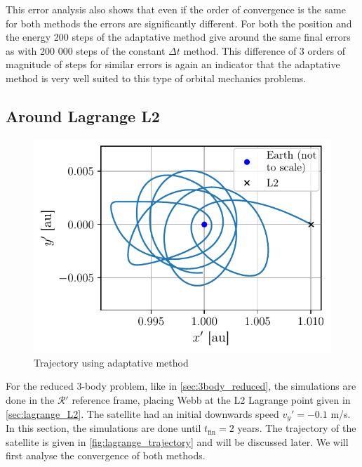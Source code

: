 This error analysis also shows that even if the order of convergence is the same for both methods the errors are significantly different. For both the position and the energy 200 steps of the adaptative method give around the same final errors as with 200 000 steps of the constant $\Delta t$ method. This difference of 3 orders of magnitude of steps for similar errors is again an indicator that the adaptative method is very well suited to this type of orbital mechanics problems.

\subsection{Around Lagrange L2}

\begin{figure}
    \vspace*{-1cm}
    \centering
    \includegraphics[width=\linewidth]{figures/lagrange_trajectory.pdf}
    \caption{Trajectory using adaptative method}
    \label{fig:lagrange_trajectory}
    \vspace*{-0.5cm}
\end{figure}
For the reduced 3-body problem, like in \autoref{sec:3body_reduced}, the simulations are done in the \(\mathcal R'\) reference frame, placing Webb at the L2 Lagrange point given in \autoref{sec:lagrange_L2}. The satellite had an initial downwards speed \(v_y' = -0.1\) m/s. In this section, the simulations are done until \(t_\textrm{fin} = 2\) years. The trajectory of the satellite is given in \autoref{fig:lagrange_trajectory} and will be discussed later. We will first analyse the convergence of both methods.


